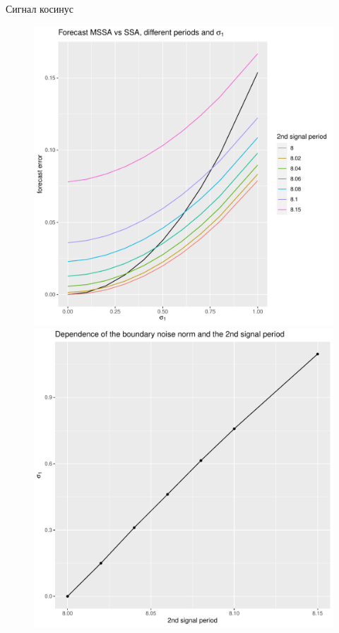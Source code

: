 \documentclass[ucs, notheorems, handout]{beamer}
\newcommand{\SSA}{\mathsf{SSA}}
\newcommand{\MSSA}{\mathsf{MSSA}}
\begin{document}
\begin{frame}{Сигнал косинус}
    \begin{figure}[h]
        \centering
        \begin{minipage}{.5\textwidth}
            \centering
            \includegraphics[width=\textwidth]{experiment_2_cos1.pdf}
        \end{minipage}%
        \begin{minipage}{.5\textwidth}
            \centering
        \includegraphics[width=\textwidth]{experiment_2_cos2.pdf}
        \end{minipage}
    \end{figure}


\end{frame}
\end{document}
